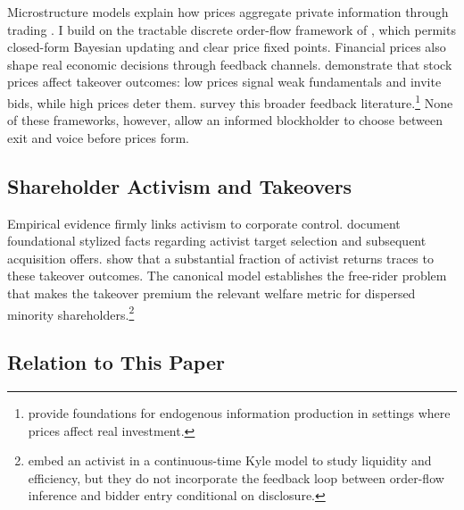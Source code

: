 \documentclass[11pt]{article}
\newcommand{\1}{\mathbf{1}}
\begin{document}
Microstructure models explain how prices aggregate private information through trading \citep{Kyle1985,GlostenMilgrom1985}. I build on the tractable discrete order-flow framework of \citet{EdmansGoldsteinJiang2015}, which permits closed-form Bayesian updating and clear price fixed points. Financial prices also shape real economic decisions through feedback channels. \citet{EdmansGoldsteinJiang2012} demonstrate that stock prices affect takeover outcomes: low prices signal weak fundamentals and invite bids, while high prices deter them. \citet{BondEdmansGoldstein2012} survey this broader feedback literature.\footnote{\citet{DowGoldsteinGuembel2017} provide foundations for endogenous information production in settings where prices affect real investment.} None of these frameworks, however, allow an informed blockholder to choose between exit and voice before prices form.

%
\subsection{Shareholder Activism and Takeovers}
%

Empirical evidence firmly links activism to corporate control. \citet{BravJiangPartnoyThomas2008} document foundational stylized facts regarding activist target selection and subsequent acquisition offers. \citet{GreenwoodSchor2009} show that a substantial fraction of activist returns traces to these takeover outcomes. The canonical \citet{GrossmanHart1980} model establishes the free-rider problem that makes the takeover premium the relevant welfare metric for dispersed minority shareholders.\footnote{\citet{BackEtAl2018} embed an activist in a continuous-time Kyle model to study liquidity and efficiency, but they do not incorporate the feedback loop between order-flow inference and bidder entry conditional on disclosure.}

%
\subsection{Relation to This Paper}
%
\end{document}
